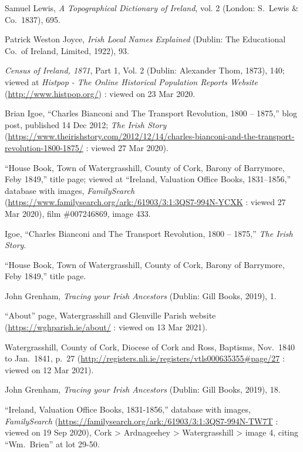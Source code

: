 {{\begin{thebibliography}{999}
Samuel Lewis, \textit{A Topographical Dictionary of Ireland}, vol. 2 (London: S.\ Lewis \& Co.\, 1837), 695.

Patrick Weston Joyce, \textit{Irish Local Names Explained} (Dublin: The Educational Co.\ of Ireland, Limited, 1922), 93.

\textit{Census of Ireland, 1871}, Part 1, Vol. 2 (Dublin: Alexander Thom, 1873), 140; viewed at \textit{Histpop - The Online Historical Population Reports Website} (\url{http://www.histpop.org/}) : viewed on 23 Mar 2020.

Brian Igoe, ``Charles Bianconi and The Transport Revolution, 1800 -- 1875,'' blog post, published 14 Dec 2012; \textit{The Irish Story} (\url{https://www.theirishstory.com/2012/12/14/charles-bianconi-and-the-transport-revolution-1800-1875/} : viewed 27 Mar 2020).

``House Book, Town of Watergrasshill, County of Cork, Barony of Barrymore, Feby 1849,'' title page; viewed at ``Ireland, Valuation Office Books, 1831--1856,'' database with images, \textit{FamilySearch} (\url{https://www.familysearch.org/ark:/61903/3:1:3QS7-994N-YCXK} : viewed 27 Mar 2020), film \#007246869, image 433.

Igoe, ``Charles Bianconi and The Transport Revolution, 1800 -- 1875,'' \textit{The Irish Story}.

``House Book, Town of Watergrasshill, County of Cork, Barony of Barrymore, Feby 1849,'' title page.

John Grenham, \textit{Tracing your Irish Ancestors} (Dublin: Gill Books, 2019), 1.

``About'' page, Watergrasshill and Glenville Parish website (\url{https://wghparish.ie/about/} : viewed on 13 Mar 2021). 

Watergrasshill, County of Cork, Diocese of Cork and Ross, Baptisms, Nov.\ 1840 to Jan.\ 1841, p.\ 27 (\url{http://registers.nli.ie/registers/vtls000635355\#page/27} : viewed on 12 Mar 2021).

John Grenham, \textit{Tracing your Irish Ancestors} (Dublin: Gill Books, 2019), 18.

``Ireland, Valuation Office Books, 1831-1856,'' database with images, \textit{FamilySearch} (\url{https://familysearch.org/ark:/61903/3:1:3QS7-994N-TW7T} : viewed on 19 Sep 2020), Cork > Ardnageehey > Watergrasshill > image 4, citing ``Wm.\ Brien'' at lot 29-50.


\end{thebibliography}}}
